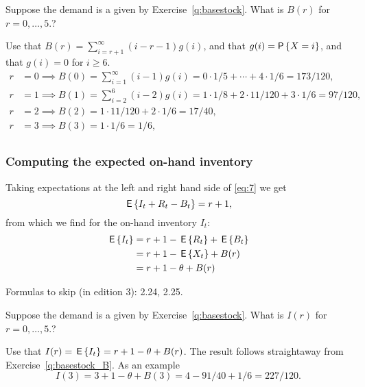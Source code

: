 \begin{question}\label{q:basestock_B}
  Suppose the demand is a given by  Exercise~\ref{q:basestock}. What is $B(r)$ for $r=0,\ldots, 5$.?
\end{question}
\begin{solution}
  Use that $B(r) = \sum_{i=r+1}^\infty (i-r-1)g(i)$, and that $g(i) = \P{X = i}$, and that $g(i)=0$ for $i\geq 6$.
  \begin{align*}
    r&=0 \implies B(0) = \sum_{i=1}^\infty (i-1)g(i) =  0\cdot 1/5 + \cdots + 4 \cdot 1/6 = 173/120, \\
    r&=1 \implies B(1) = \sum_{i=2}^6 (i-2)g(i) =  1\cdot 1/8 + 2\cdot 11/120 + 3 \cdot 1/6 = 97/120, \\
    r&=2 \implies B(2) = 1\cdot 11/120 + 2 \cdot 1/6 = 17/40, \\
    r&=3 \implies B(3) = 1 \cdot 1/6 = 1/6, \\
  \end{align*}
\end{solution}


\subsubsection{Computing the expected on-hand inventory}

Taking expectations at the left and right hand side of \eqref{eq:7} we get
\begin{equation*}
  \,\mathsf{E}\left\{I_t + R_t - B_t\right\} = r+1,
\end{equation*}
from which we find for the on-hand inventory $I_t$: 
\begin{equation}
  \label{eq:6}
  \begin{split}
  \,\mathsf{E}\left\{I_t\right\}
  &= r+1 - \,\mathsf{E}\left\{R_t\right\} + \,\mathsf{E}\left\{B_t\right\}  \\
  & = r + 1 - \,\mathsf{E}\left\{X_t\right\} + B(r) \\
  & = r + 1 - \theta + B(r) \\
  \end{split}
\end{equation}

Formulas to skip (in edition 3): 2.24, 2.25. 

\begin{question}
Suppose the demand is a given by Exercise~\ref{q:basestock}. What is $I(r)$ for $r=0,\ldots, 5$.?
\end{question}
\begin{solution}
  Use that $I(r) = \,\mathsf{E}\left\{I_t\right\} = r+1-\theta + B(r)$.  The result follows straightaway from Exercise~\ref{q:basestock_B}. As an example
  \begin{equation*}
    I(3) = 3+1 - \theta + B(3) = 4 - 91/40 + 1/6 = 227/120.
  \end{equation*}
\end{solution}

